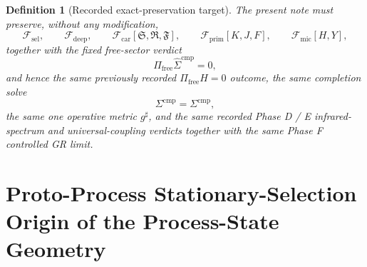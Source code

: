 \documentclass[11pt]{article}
\newcommand{\CompletedMetric}{g^{\sharp}}
\newcommand{\CompShift}{\Sigma^{\mathrm{cmp}}}
\newcommand{\CompLift}{\widehat\Sigma^{\mathrm{cmp}}}
\newcommand{\FreeProj}{\Pi_{\mathrm{free}}}
\newcommand{\GaugeAux}{Y}
\newcommand{\MicFunctional}{\mathscr F_{\mathrm{mic}}}
\newcommand{\PrimFunctional}{\mathscr F_{\mathrm{prim}}}
\newcommand{\CarrierFunctional}{\mathscr F_{\mathrm{car}}}
\newcommand{\DeepFunctional}{\mathscr F_{\mathrm{deep}}}
\newcommand{\StemFunctional}{\mathscr F_{\mathrm{sel}}}
\newcommand{\PrimStrain}{K}
\newcommand{\PrimNeutral}{J}
\newcommand{\PrimFree}{F}
\newcommand{\CarrierSeed}{\mathfrak S}
\newcommand{\RelabelSeed}{\mathfrak R}
\newcommand{\FreeSeed}{\mathfrak F}
\newtheorem{definition}{Definition}
\begin{document}
\begin{definition}[Recorded exact-preservation target]
\label{def:recorded_target}
The present note must preserve, without any modification,
\begin{equation}
\StemFunctional,
\qquad
\DeepFunctional,
\qquad
\CarrierFunctional[\CarrierSeed,\RelabelSeed,\FreeSeed],
\qquad
\PrimFunctional[\PrimStrain,\PrimNeutral,\PrimFree],
\qquad
\MicFunctional[H,\GaugeAux],
\label{eq:target_functionals}
\end{equation}
together with the fixed free-sector verdict
\begin{equation}
\FreeProj\CompLift=0,
\label{eq:target_free}
\end{equation}
and hence the same previously recorded \(\Pi_{\mathrm{free}}H=0\) outcome, the same completion solve
\begin{equation}
\CompShift=\Sigma^{\mathrm{cmp}},
\label{eq:target_sigma}
\end{equation}
the same one operative metric \(\CompletedMetric\), and the same recorded Phase D / E infrared-spectrum and universal-coupling verdicts together with the same Phase F controlled GR limit.
\end{definition}

\section{Proto-Process Stationary-Selection Origin of the Process-State Geometry}
\end{document}
